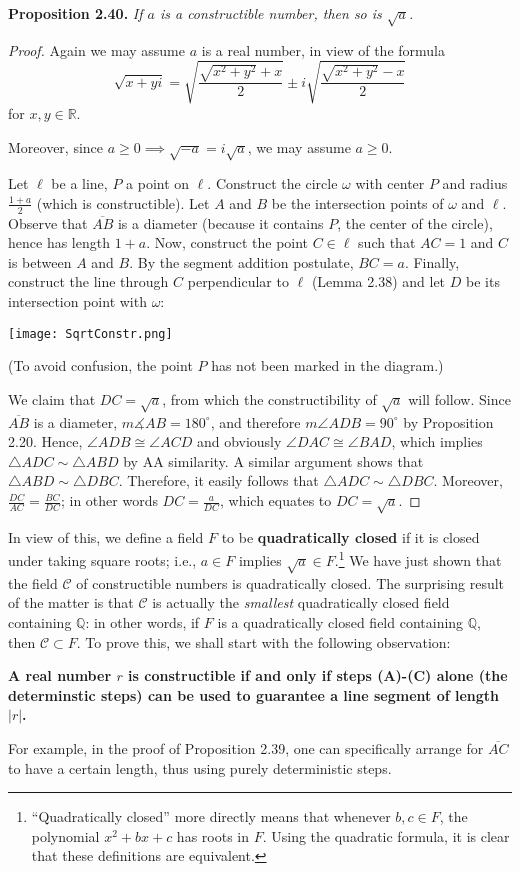 \documentclass[leqno]{book}
\begin{document}
\noindent\textbf{Proposition 2.40.} \emph{If $a$ is a constructible number, then so is $\sqrt a$.}
\begin{proof}
Again we may assume $a$ is a real number, in view of the formula
$$\sqrt{x+yi}=\sqrt{\frac{\sqrt{x^2+y^2}+x}2}\pm i\sqrt{\frac{\sqrt{x^2+y^2}-x}2}$$
for $x,y\in\mathbb R$.

Moreover, since $a\geqslant 0\implies\sqrt{-a}=i\sqrt a$, we may assume $a\geqslant 0$.

Let $\ell$ be a line, $P$ a point on $\ell$.  Construct the circle $\omega$ with center $P$ and radius $\frac{1+a}2$ (which is constructible).  Let $A$ and $B$ be the intersection points of $\omega$ and $\ell$.  Observe that $\overline{AB}$ is a diameter (because it contains $P$, the center of the circle), hence has length $1+a$.  Now, construct the point $C\in\ell$ such that $AC=1$ and $C$ is between $A$ and $B$.  By the segment addition postulate, $BC=a$.  Finally, construct the line through $C$ perpendicular to $\ell$ (Lemma 2.38) and let $D$ be its intersection point with $\omega$:
\begin{center}\texttt{[image: SqrtConstr.png]}\end{center}
(To avoid confusion, the point $P$ has not been marked in the diagram.)

We claim that $DC=\sqrt a$, from which the constructibility of $\sqrt a$ will follow.  Since $\overline{AB}$ is a diameter, $m\measuredangle AB=180^\circ$, and therefore $m\angle ADB=90^\circ$ by Proposition 2.20.  Hence, $\angle ADB\cong\angle ACD$ and obviously $\angle DAC\cong\angle BAD$, which implies $\triangle ADC\sim\triangle ABD$ by AA similarity.  A similar argument shows that $\triangle ABD\sim\triangle DBC$.  Therefore, it easily follows that $\triangle ADC\sim\triangle DBC$.  Moreover, $\frac{DC}{AC}=\frac{BC}{DC}$; in other words $DC=\frac a{DC}$, which equates to $DC=\sqrt a$.
\end{proof}
\noindent In view of this, we define a field $F$ to be \textbf{quadratically closed} if it is closed under taking square roots; i.e., $a\in F$ implies $\sqrt a\in F$.\footnote{``Quadratically closed'' more directly means that whenever $b,c\in F$, the polynomial $x^2+bx+c$ has roots in $F$.  Using the quadratic formula, it is clear that these definitions are equivalent.}  We have just shown that the field $\mathscr C$ of constructible numbers is quadratically closed.  The surprising result of the matter is that $\mathscr C$ is actually the \emph{smallest} quadratically closed field containing $\mathbb Q$: in other words, if $F$ is a quadratically closed field containing $\mathbb Q$, then $\mathscr C\subset F$.  To prove this, we shall start with the following observation:
\begin{center}
\textbf{A real number $r$ is constructible if and only if steps (A)-(C) alone (the determinstic steps) can be used to guarantee a line segment of length $|r|$.}
\end{center}
For example, in the proof of Proposition 2.39, one can specifically arrange for $\overline{AC}$ to have a certain length, thus using purely deterministic steps.
\end{document}
